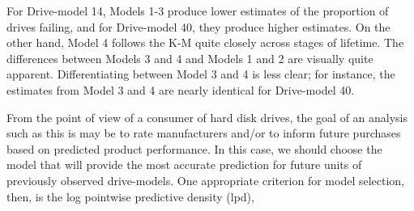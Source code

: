 \documentclass[12pt]{article}
\begin{document}
For Drive-model 14, Models 1-3 produce lower estimates of the proportion of drives failing, and for Drive-model 40, they produce higher estimates.  On the other hand, Model 4 follows the K-M quite closely across stages of lifetime.  The differences between Models 3 and 4 and Models 1 and 2 are visually quite apparent.  Differentiating between Model 3 and 4 is less clear; for instance, the estimates from Model 3 and 4 are nearly identical for Drive-model 40.



From the point of view of a consumer of hard disk drives, the goal of an analysis such as this is may be to rate manufacturers and/or to inform future purchases based on predicted product performance. In this case, we should choose the model that will provide the most accurate prediction for future units of previously observed drive-models. One appropriate criterion for model selection, then, is the log pointwise predictive density (lpd),
\end{document}
